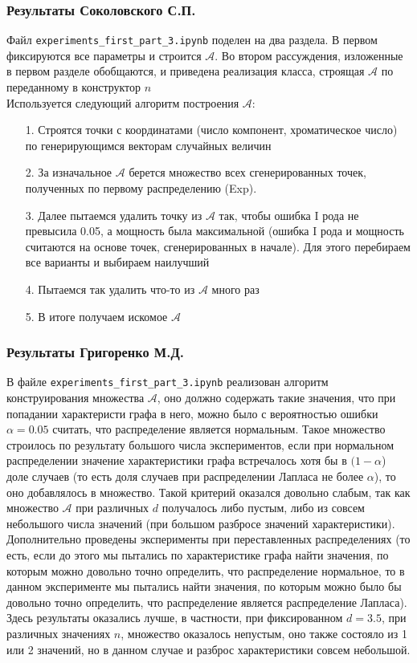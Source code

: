 \documentclass[a4paper,12pt]{article}
\begin{document}
\subsubsection*{Результаты Соколовского С.П.}
Файл \texttt{experiments\_first\_part\_3.ipynb} поделен на два раздела. В первом фиксируются все параметры и строится $\mathcal{A}$. Во втором рассуждения, изложенные в первом разделе обобщаются, и приведена реализация класса, строящая $\mathcal{A}$ по переданному в конструктор $n$ \\
Используется следующий алгоритм построения $\mathcal{A}$:
\begin{itemize}
    \item[1.] Строятся точки с координатами (число компонент, хроматическое число) по генерирующимся векторам случайных величин
    \item[2.] За изначальное $\mathcal{A}$ берется множество всех сгенерированных точек, полученных по первому распределению (Exp).
    \item[3.] Далее пытаемся удалить точку из $\mathcal{A}$ так, чтобы ошибка I рода не превысила 0.05, а мощность была максимальной (ошибка I рода и мощность считаются на основе точек, сгенерированных в начале). Для этого перебираем все варианты и выбираем наилучший
    \item[4.] Пытаемся так удалить что-то из $\mathcal{A}$ много раз
    \item[5.] В итоге получаем искомое $\mathcal{A}$
\end{itemize}
\subsubsection*{Результаты Григоренко М.Д.}
В файле \texttt{experiments\_first\_part\_3.ipynb} реализован алгоритм конструирования множества $\mathcal{A}$, оно должно содержать такие значения, что при попадании характеристи графа в него, можно было с вероятностью ошибки $\alpha=0.05$ считать, что распределение является нормальным. Такое множество строилось по результату большого числа экспериментов, если при нормальном распределении значение характеристики графа встречалось хотя бы в $(1-\alpha$) доле случаев (то есть доля случаев при распределении Лапласа не более $\alpha$), то оно добавлялось в множество. Такой критерий оказался довольно слабым, так как множество $\mathcal{A}$ при различных $d$ получалось либо пустым, либо из совсем небольшого числа значений (при большом разбросе значений характеристики). Дополнительно проведены эксперименты при переставленных распределениях (то есть, если до этого мы пытались по характеристике графа найти значения, по которым можно довольно точно определить, что распределение нормальное, то в данном эксперименте мы пытались найти значения, по которым можно было бы довольно точно определить, что распределение является распределение Лапласа). Здесь результаты оказались лучше, в частности, при фиксированном $d=3.5$, при различных значениях $n$, множество оказалось непустым, оно также состояло из 1 или 2 значений, но в данном случае и разброс характеристики совсем небольшой.
\end{document}
